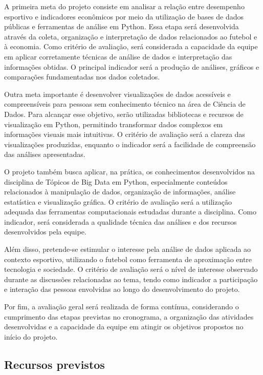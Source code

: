 \documentclass[12pt, a4paper, brazil]{article}
\begin{document}
A primeira meta do projeto consiste em analisar a relação entre desempenho esportivo e indicadores econômicos por meio da utilização de bases de dados públicas e ferramentas de análise em Python. Essa etapa será desenvolvida através da coleta, organização e interpretação de dados relacionados ao futebol e à economia. Como critério de avaliação, será considerada a capacidade da equipe em aplicar corretamente técnicas de análise de dados e interpretação das informações obtidas. O principal indicador será a produção de análises, gráficos e comparações fundamentadas nos dados coletados.

Outra meta importante é desenvolver visualizações de dados acessíveis e compreensíveis para pessoas sem conhecimento técnico na área de Ciência de Dados. Para alcançar esse objetivo, serão utilizadas bibliotecas e recursos de visualização em Python, permitindo transformar dados complexos em informações visuais mais intuitivas. O critério de avaliação será a clareza das visualizações produzidas, enquanto o indicador será a facilidade de compreensão das análises apresentadas.

O projeto também busca aplicar, na prática, os conhecimentos desenvolvidos na disciplina de Tópicos de Big Data em Python, especialmente conteúdos relacionados à manipulação de dados, organização de informações, análise estatística e visualização gráfica. O critério de avaliação será a utilização adequada das ferramentas computacionais estudadas durante a disciplina. Como indicador, será considerada a qualidade técnica das análises e dos recursos desenvolvidos pela equipe.

Além disso, pretende-se estimular o interesse pela análise de dados aplicada ao contexto esportivo, utilizando o futebol como ferramenta de aproximação entre tecnologia e sociedade. O critério de avaliação será o nível de interesse observado durante as discussões relacionadas ao tema, tendo como indicador a participação e interação das pessoas envolvidas ao longo do desenvolvimento do projeto.

Por fim, a avaliação geral será realizada de forma contínua, considerando o cumprimento das etapas previstas no cronograma, a organização das atividades desenvolvidas e a capacidade da equipe em atingir os objetivos propostos no início do projeto.

\subsection{Recursos previstos}
\end{document}
